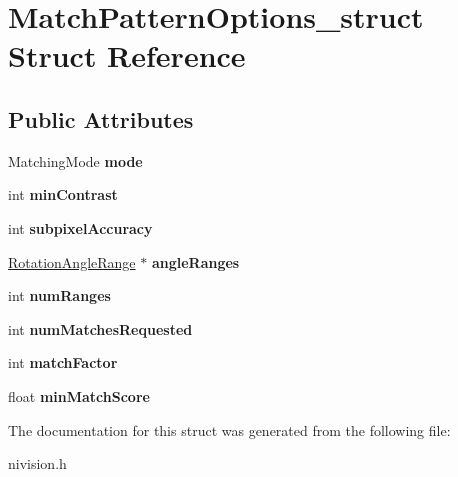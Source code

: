 \hypertarget{structMatchPatternOptions__struct}{\section{\-Match\-Pattern\-Options\-\_\-struct \-Struct \-Reference}
\label{structMatchPatternOptions__struct}
}
\subsection*{\-Public \-Attributes}
\begin{DoxyCompactItemize}
\item 
\hypertarget{structMatchPatternOptions__struct_ab1e170717034764e8ad65570dca7506f}{\-Matching\-Mode {\bfseries mode}}\label{structMatchPatternOptions__struct_ab1e170717034764e8ad65570dca7506f}

\item 
\hypertarget{structMatchPatternOptions__struct_a6db2d921ce9f44f1f412c43f5180f2f0}{int {\bfseries min\-Contrast}}\label{structMatchPatternOptions__struct_a6db2d921ce9f44f1f412c43f5180f2f0}

\item 
\hypertarget{structMatchPatternOptions__struct_a705ce296b6255718b1ceee611d9f5899}{int {\bfseries subpixel\-Accuracy}}\label{structMatchPatternOptions__struct_a705ce296b6255718b1ceee611d9f5899}

\item 
\hypertarget{structMatchPatternOptions__struct_a02aa56767f9e33b832e77458eb1e8992}{\hyperlink{structRotationAngleRange__struct}{\-Rotation\-Angle\-Range} $\ast$ {\bfseries angle\-Ranges}}\label{structMatchPatternOptions__struct_a02aa56767f9e33b832e77458eb1e8992}

\item 
\hypertarget{structMatchPatternOptions__struct_af1663ff7555712167283b72200a1b160}{int {\bfseries num\-Ranges}}\label{structMatchPatternOptions__struct_af1663ff7555712167283b72200a1b160}

\item 
\hypertarget{structMatchPatternOptions__struct_a10fefb2ee3eaf6721f0851240708b944}{int {\bfseries num\-Matches\-Requested}}\label{structMatchPatternOptions__struct_a10fefb2ee3eaf6721f0851240708b944}

\item 
\hypertarget{structMatchPatternOptions__struct_aec4093a0d57c047149def8dba39ee25b}{int {\bfseries match\-Factor}}\label{structMatchPatternOptions__struct_aec4093a0d57c047149def8dba39ee25b}

\item 
\hypertarget{structMatchPatternOptions__struct_a19d4732abdf05e0bcf0a8ee5330067e3}{float {\bfseries min\-Match\-Score}}\label{structMatchPatternOptions__struct_a19d4732abdf05e0bcf0a8ee5330067e3}

\end{DoxyCompactItemize}


\-The documentation for this struct was generated from the following file\-:\begin{DoxyCompactItemize}
\item 
nivision.\-h\end{DoxyCompactItemize}
